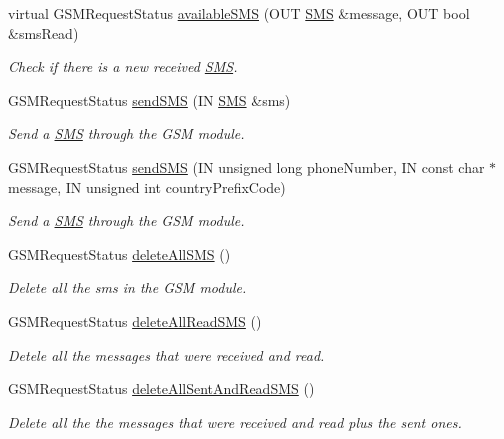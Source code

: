 \begin{DoxyCompactItemize}
virtual G\+S\+M\+Request\+Status \hyperlink{class_easyuino_1_1_g_s_m_service_a02c2bddace1c87f035f324ae248c4f1d}{available\+S\+MS} (O\+UT \hyperlink{class_easyuino_1_1_s_m_s}{S\+MS} \&message, O\+UT bool \&sms\+Read)
\begin{DoxyCompactList}\small\item\em Check if there is a new received \hyperlink{class_easyuino_1_1_s_m_s}{S\+MS}. \end{DoxyCompactList}\item 
G\+S\+M\+Request\+Status \hyperlink{class_easyuino_1_1_g_s_m_service_ae860cc330ef552c733d9ab4a5c2fd366}{send\+S\+MS} (IN \hyperlink{class_easyuino_1_1_s_m_s}{S\+MS} \&sms)
\begin{DoxyCompactList}\small\item\em Send a \hyperlink{class_easyuino_1_1_s_m_s}{S\+MS} through the G\+SM module. \end{DoxyCompactList}\item 
G\+S\+M\+Request\+Status \hyperlink{class_easyuino_1_1_g_s_m_service_ad37d83f2a91fbe2e50a11f1d435eccb5}{send\+S\+MS} (IN unsigned long phone\+Number, IN const char $\ast$message, IN unsigned int country\+Prefix\+Code)
\begin{DoxyCompactList}\small\item\em Send a \hyperlink{class_easyuino_1_1_s_m_s}{S\+MS} through the G\+SM module. \end{DoxyCompactList}\item 
G\+S\+M\+Request\+Status \hyperlink{class_easyuino_1_1_g_s_m_service_aef4379e7c82f275f0af341f79a3b451f}{delete\+All\+S\+MS} ()
\begin{DoxyCompactList}\small\item\em Delete all the sms in the G\+SM module. \end{DoxyCompactList}\item 
G\+S\+M\+Request\+Status \hyperlink{class_easyuino_1_1_g_s_m_service_af142e4f7d99cffda9a3598446466cdb3}{delete\+All\+Read\+S\+MS} ()
\begin{DoxyCompactList}\small\item\em Detele all the messages that were received and read. \end{DoxyCompactList}\item 
G\+S\+M\+Request\+Status \hyperlink{class_easyuino_1_1_g_s_m_service_a7b457ab0669a8e9c16ab1906cc246365}{delete\+All\+Sent\+And\+Read\+S\+MS} ()
\begin{DoxyCompactList}\small\item\em Delete all the the messages that were received and read plus the sent ones. \end{DoxyCompactList}\end{DoxyCompactItemize}
